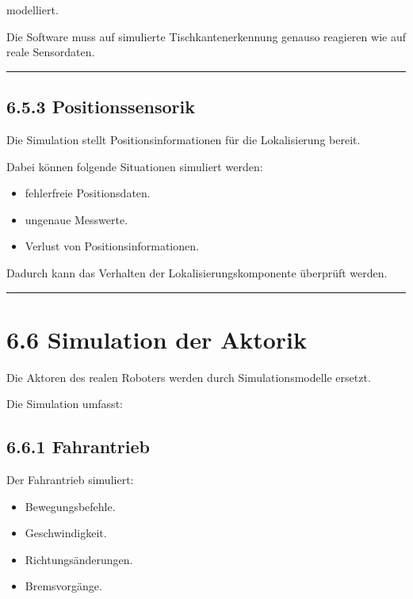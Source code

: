 \documentclass[
  a4paper,
  12pt,
  DIV=12,        %
  parskip=half,  %
  headings=small %
]{scrartcl}
\theoremstyle{definition}
\providecommand{\tightlist}{%
  \setlength{\itemsep}{0pt}\setlength{\parskip}{0pt}}
\theoremstyle{definition}
\providecommand{\tightlist}{%
  \setlength{\itemsep}{0pt}\setlength{\parskip}{0pt}}
\begin{document}
modelliert.

Die Software muss auf simulierte Tischkantenerkennung genauso reagieren
wie auf reale Sensordaten.

\begin{center}\rule{0.5\linewidth}{0.5pt}\end{center}

\subsection{6.5.3 Positionssensorik}\label{positionssensorik}

Die Simulation stellt Positionsinformationen für die Lokalisierung
bereit.

Dabei können folgende Situationen simuliert werden:

\begin{itemize}
\tightlist
\item
  fehlerfreie Positionsdaten.
\item
  ungenaue Messwerte.
\item
  Verlust von Positionsinformationen.
\end{itemize}

Dadurch kann das Verhalten der Lokalisierungskomponente überprüft
werden.

\begin{center}\rule{0.5\linewidth}{0.5pt}\end{center}

\section{6.6 Simulation der Aktorik}\label{simulation-der-aktorik}

Die Aktoren des realen Roboters werden durch Simulationsmodelle ersetzt.

Die Simulation umfasst:

\subsection{6.6.1 Fahrantrieb}\label{fahrantrieb}

Der Fahrantrieb simuliert:

\begin{itemize}
\tightlist
\item
  Bewegungsbefehle.
\item
  Geschwindigkeit.
\item
  Richtungsänderungen.
\item
  Bremsvorgänge.
\end{itemize}
\end{document}
